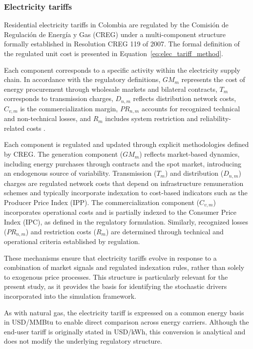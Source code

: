 \documentclass[authoryear,preprint,review,10pt]{elsarticle}
\begin{document}
\subsubsection{Electricity tariffs}

Residential electricity tariffs in Colombia are regulated by the Comisión de Regulación de Energía y Gas (CREG) under a multi-component structure formally established in Resolution CREG 119 of 2007. The formal definition of the regulated unit cost is presented in Equation~\ref{eq:elec_tariff_method}.

Each component corresponds to a specific activity within the electricity supply chain. In accordance with the regulatory definitions, $GM_m$ represents the cost of energy procurement through wholesale markets and bilateral contracts, $T_m$ corresponds to transmission charges, $D_{n,m}$ reflects distribution network costs, $C_{v,m}$ is the commercialization margin, $PR_{n,m}$ accounts for recognized technical and non-technical losses, and $R_m$ includes system restriction and reliability-related costs \citep{CREG119_2007}.

Each component is regulated and updated through explicit methodologies defined by CREG. The generation component ($GM_m$) reflects market-based dynamics, including energy purchases through contracts and the spot market, introducing an endogenous source of variability. Transmission ($T_m$) and distribution ($D_{n,m}$) charges are regulated network costs that depend on infrastructure remuneration schemes and typically incorporate indexation to cost-based indicators such as the Producer Price Index (IPP). The commercialization component ($C_{v,m}$) incorporates operational costs and is partially indexed to the Consumer Price Index (IPC), as defined in the regulatory formulation. Similarly, recognized losses ($PR_{n,m}$) and restriction costs ($R_m$) are determined through technical and operational criteria established by regulation.

These mechanisms ensure that electricity tariffs evolve in response to a combination of market signals and regulated indexation rules, rather than solely to exogenous price processes. This structure is particularly relevant for the present study, as it provides the basis for identifying the stochastic drivers incorporated into the simulation framework.

As with natural gas, the electricity tariff is expressed on a common energy basis in USD/MMBtu to enable direct comparison across energy carriers. Although the end-user tariff is originally stated in USD/kWh, this conversion is analytical and does not modify the underlying regulatory structure.
\end{document}
